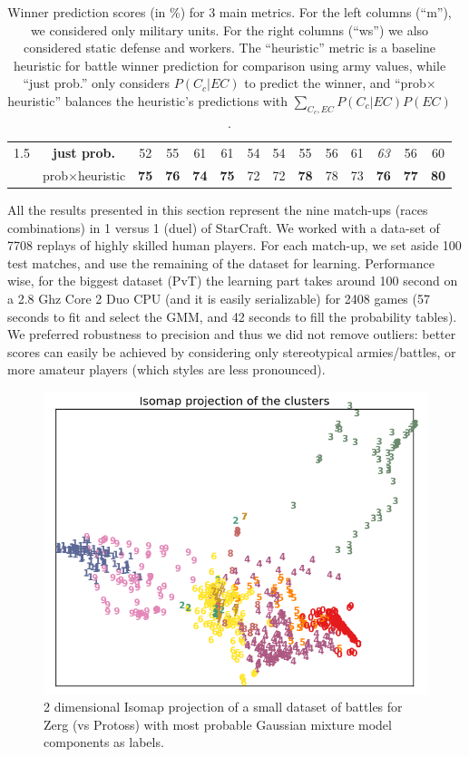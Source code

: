 \begin{table}[ht]
\begin{center}
\begin{footnotesize}
\begin{tabular}{|c|c|cc|cc|cc|cc|cc|cc|}
1.5     & \textbf{just prob.} & 52 & 55 & 61 & 61 & 54 & 54 & 55 & 56 & 61 & \textit{63} & 56 & 60 \\
    & prob$\times$heuristic & \textbf{75} & \textbf{76} & \textbf{74} & \textbf{75} & 72 & 72 & \textbf{78} & 78 & 73 & \textbf{76} & \textbf{77} & \textbf{80} \\
\hline
\end{tabular}
\label{results}
\caption{Winner prediction scores (in \%) for 3 main metrics. For the left columns (``m''), we considered only military units. For the right columns (``ws'') we also considered static defense and workers. The ``heuristic'' metric is a baseline heuristic for battle winner prediction for comparison using army values, while ``just prob.'' only considers $P(C_c|EC)$ to predict the winner, and ``prob$\times$heuristic'' balances the heuristic's predictions with $\sum_{C_c,EC}P(C_c|EC)P(EC)$.}

\end{footnotesize}
\end{center}
\end{table}
All the results presented in this section represent the nine match-ups (races combinations) in 1 versus 1 (duel) of StarCraft. We worked with a data-set of 7708 replays of highly skilled human players. For each match-up, we set aside 100 test matches, and use the remaining of the dataset for learning. Performance wise, for the biggest dataset (PvT) the learning part takes around 100 second on a 2.8 Ghz Core 2 Duo CPU (and it is easily serializable) for 2408 games (57 seconds to fit and select the GMM, and 42 seconds to fill the probability tables). %
We preferred robustness to precision and thus we did not remove outliers: better scores can easily be achieved by considering only stereotypical armies/battles, or more amateur players (which styles are less pronounced). 

\begin{figure}[htp]
\centerline{\includegraphics[width=0.55\columnwidth]{images/GMM_ISO_Z2.png}}
\label{isoz}
\caption{2 dimensional Isomap projection of a small dataset of battles for Zerg (vs Protoss) with most probable Gaussian mixture model components as labels.}
\end{figure}

